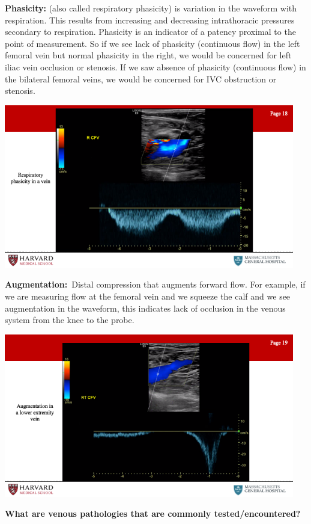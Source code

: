\documentclass[
]{book}
\begin{document}
\textbf{Phasicity:} (also called respiratory phasicity) is variation in the
waveform with respiration. This results from increasing and decreasing
intrathoracic pressures secondary to respiration. Phasicity is an
indicator of a patency proximal to the point of measurement. So if we
see lack of phasicity (continuous flow) in the left femoral vein but
normal phasicity in the right, we would be concerned for left iliac vein
occlusion or stenosis. If we saw absence of phasicity (continuous flow)
in the bilateral femoral veins, we would be concerned for IVC
obstruction or stenosis.

\includegraphics[width=5in]{images/vasc_lab/Slide19}

\textbf{Augmentation:}~Distal compression that augments forward flow. For
example, if we are measuring flow at the femoral vein and we squeeze the
calf and we see augmentation in the waveform, this indicates lack of
occlusion in the venous system from the knee to the probe.

\includegraphics[width=5in]{images/vasc_lab/Slide20}

\textbf{What are venous pathologies that are commonly tested/encountered?}
\end{document}
